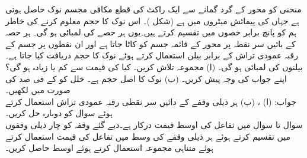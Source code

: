 منحنی  کو  محور کے گرد گمانے سے ایک راکٹ کی قطع مکافی مجسم نوک حاصل ہوتی ہے جہاں  کی پیمائش میٹروں میں ہے (شکل )۔ اس نوک کا حجم معلوم کرنے کی خاطر ہم  کو پانچ  برابر حصوں میں تقسیم کرتے ہیں۔یوں ہر حصے کی لمبائی  ہو گی۔ ہر حصہ کے بائیں سر نقطہ پر  محور کے قائمہ جسم کو کاٹا جاتا ہے اور ان نقطوں پر جسم کے رقبہ عمودی تراش کے برابر بیلن استعمال کرتے ہوئے نوک کا حجم دریافت کیا جاتا ہے۔ بیلنوں کی لمبائی  ہو گی۔ (ا) مجموعہ  تلاش کریں۔ کیا  کی قیمت  سے کم یا زیادہ ہو گی؟ اپنے جواب کی وجہ پیش کریں۔ (ب) نوک کا اصل حجم  ہے۔ خلل  کو  کے فی صد کی صورت میں لکھیں۔ \\
جواب:\quad
(ا) ، (ب) 
ہر ذیلی وقفے کے دائیں سر نقطی رقبہ عمودی تراش استعمال کرتے ہوئے سوال  کو دوبارہ حل کریں۔
\\
سوال  تا سوال  میں تفاعل  کی اوسط قیمت درکار ہے۔دیے گئے وقفہ کو چار ذیلی وقفوں میں تقسیم کرتے ہوئے ہر ذیلی وقفے کی وسط میں تفاعل کی قیمت استعمال کرتے ہوئے متناہی مجموعہ استعمال کرتے ہوئے اوسط حاصل کریں۔

